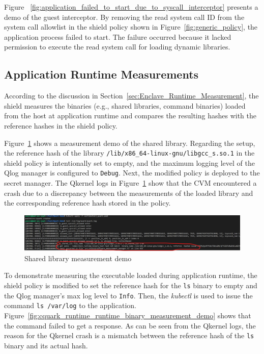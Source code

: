 Figure ~\ref{fig:application_failed_to_start_due_to_syscall_interceptor} presents a demo of the guest interceptor. By removing the read system call ID from the system call allowlist in the shield policy shown in Figure~\ref{fig:generic_policy}, 
the application process failed to start. The failure occurred because it lacked permission to execute the read system call for loading dynamic libraries.

\subsection{Application Runtime Measurements}
\label{sec:eva_qualitativ_runtime_meausre}
According to the discussion in Section~\ref{sec:Enclave_Runtime_Measurement}, the shield measures the binaries (e.g., shared libraries, command binaries) loaded from the host at application runtime and compares the resulting hashes with the reference hashes in the shield policy.  

Figure~\ref{fig:cquark_runtime_runtime_lib_measurement_demo} shows a measurement demo of the shared library. Regarding the setup, the reference hash of the library \texttt{/lib/x86\_64-linux-gnu/libgcc\_s.so.1} in the shield policy is intentionally set to empty, and the maximum logging level of the 
Qlog manager is configured to \texttt{Debug}. Next, the modified policy is deployed to the secret manager. The Qkernel logs in Figure~\ref{fig:cquark_runtime_runtime_lib_measurement_demo} show that the \acrshort{CVM} encountered a crash due to a discrepancy between the measurements of the loaded library and the corresponding reference hash stored in the policy.


\begin{figure}[!htb]
    \centering
    \includegraphics[width=1\textwidth]{images/cquark_runtime_runtime_lib_measurement_demo.png}
    \caption[Shared library measurement demo]{Shared library measurement demo}
    \label{fig:cquark_runtime_runtime_lib_measurement_demo}
\end{figure}


To demonstrate measuring the executable loaded during application runtime, the shield policy is modified to set the reference hash for the \texttt{ls} binary to empty and the Qlog manager's max log level to \texttt{Info}. Then, the \emph{kubectl} is used to 
issue the command \texttt{ls /var/log} to the application. Figure~\ref{fig:cquark_runtime_runtime_binary_measurement_demo} shows that the command failed to get a response. As can be seen from the Qkernel logs, the reason for the Qkernel crash is a mismatch between the 
reference hash of the \texttt{ls} binary and its actual hash.


